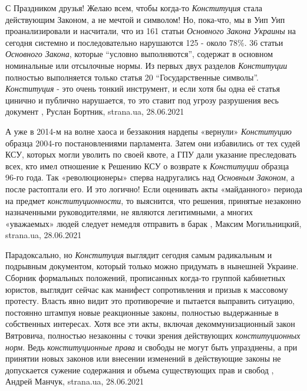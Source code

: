 С Праздником друзья! Желаю всем, чтобы когда-то \emph{Конституция} стала действующим
Законом, а не мечтой и символом!  Но, пока-что, мы в Уип Уип проанализировали и
насчитали, что из 161 статьи \emph{Основного Закона Украины} на сегодня системно и
последовательно нарушаются 125 - около 78\%. 36 статьи \emph{Основного Закона},
которые \enquote{условно выполняются}, содержат в основном номинальные или отсылочные
нормы. Из первых двух разделов \emph{Конституции} полностью выполняется только статья
20 \enquote{Государственные символы}.  \emph{Конституция} - это очень тонкий инструмент, и
если хотя бы одна её статья цинично и публично нарушается, то это ставит под
угрозу разрушения весь документ
,
Руслан Бортник, strana.ua, 28.06.2021

А уже в 2014-м на волне хаоса и беззакония нардепы «вернули» \emph{Конституцию}
образца 2004-го постановлениями парламента. Затем они избавились от тех судей
КСУ, которых могли уволить по своей квоте, а ГПУ дали указание преследовать
всех, кто имел отношение к Решению КСУ о возврате к \emph{Конституции} образца 96-го
года.  Так «революционеры» сперва надругались над \emph{Основным Законом}, а после
растоптали его. И это логично! Если оценивать акты «майданного» периода на
предмет \emph{конституционности}, то выяснится, что решения, принятые незаконно
назначенными руководителями, не являются легитимными, а многих «уважаемых»
людей следует немедля отправить в барак
, 
Максим Могильницкий, strana.ua, 28.06.2021



Парадоксально, но \emph{Конституция} выглядит сегодня самым радикальным и подрывным
документом, который только можно придумать в нынешней Украине. Сборник
формальных положений, прописанных когда-то группой кабинетных юристов, выглядит
сейчас как манифест сопротивления и призыв к массовому протесту. Власть явно
видит это противоречие и пытается выправить ситуацию, постоянно штампуя новые
реакционные законы, полностью выдержанные в собственных интересах.  Хотя все
эти акты, включая декоммунизационный закон Вятровича, полностью незаконны с
точки зрения действующих \emph{конституционных норм}. Ведь \emph{конституционные права} и
свободы не могут быть упразднены, а при принятии новых законов или внесении
изменений в действующие законы не допускается сужение содержания и объема
существующих прав и свобод
, 
Андрей Манчук, strana.ua, 28.06.2021

